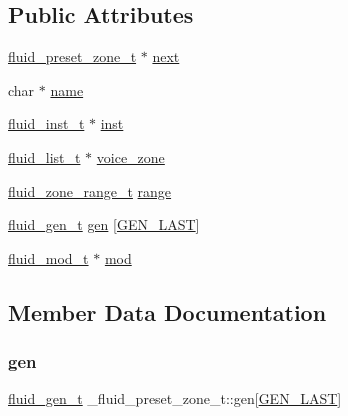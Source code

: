 \subsection*{Public Attributes}
\begin{DoxyCompactItemize}
\item 
\hyperlink{fluid__defsfont_8h_a74cb7075332911049d39e60df50019b2}{fluid\+\_\+preset\+\_\+zone\+\_\+t} $\ast$ \hyperlink{struct__fluid__preset__zone__t_abdcf33554d9679b87d458b2125cbba0f}{next}
\item 
char $\ast$ \hyperlink{struct__fluid__preset__zone__t_a9468bab1815189b07cb98cb636b73240}{name}
\item 
\hyperlink{fluid__defsfont_8h_a1b1f6837e2a2afb33a0ead36f0989727}{fluid\+\_\+inst\+\_\+t} $\ast$ \hyperlink{struct__fluid__preset__zone__t_ac0e24692d603fdfd140c5e0bf4875f53}{inst}
\item 
\hyperlink{fluid__list_8h_a3ef7535d4290862c0af118569223bd89}{fluid\+\_\+list\+\_\+t} $\ast$ \hyperlink{struct__fluid__preset__zone__t_a2fb65f12d2ae63bade54afe578cbc167}{voice\+\_\+zone}
\item 
\hyperlink{fluidsynth__priv_8h_ac8502f0049ba8c20821b136e611462da}{fluid\+\_\+zone\+\_\+range\+\_\+t} \hyperlink{struct__fluid__preset__zone__t_ace88940d54aefcd8551dfcec08094dc2}{range}
\item 
\hyperlink{fluid__gen_8h_a018737d76d5ad530b622bd27b70701b0}{fluid\+\_\+gen\+\_\+t} \hyperlink{struct__fluid__preset__zone__t_abf135229ac868c6c98f81a16a81faea0}{gen} \mbox{[}\hyperlink{gen_8h_ad17a24ae3b25f3b8cc5762f818eef9b4a9c372c341b7b1a718f0016f40c615cf3}{G\+E\+N\+\_\+\+L\+A\+ST}\mbox{]}
\item 
\hyperlink{types_8h_a6c727efab500d6c0c350d4292e9aa5ef}{fluid\+\_\+mod\+\_\+t} $\ast$ \hyperlink{struct__fluid__preset__zone__t_ac47759c0943fd3359d8fc8e2a0713f18}{mod}
\end{DoxyCompactItemize}


\subsection{Member Data Documentation}
\mbox{\label{struct__fluid__preset__zone__t_abf135229ac868c6c98f81a16a81faea0}} 
\subsubsection{\texorpdfstring{gen}{gen}}
{\footnotesize\ttfamily \hyperlink{fluid__gen_8h_a018737d76d5ad530b622bd27b70701b0}{fluid\+\_\+gen\+\_\+t} \+\_\+fluid\+\_\+preset\+\_\+zone\+\_\+t\+::gen\mbox{[}\hyperlink{gen_8h_ad17a24ae3b25f3b8cc5762f818eef9b4a9c372c341b7b1a718f0016f40c615cf3}{G\+E\+N\+\_\+\+L\+A\+ST}\mbox{]}}

